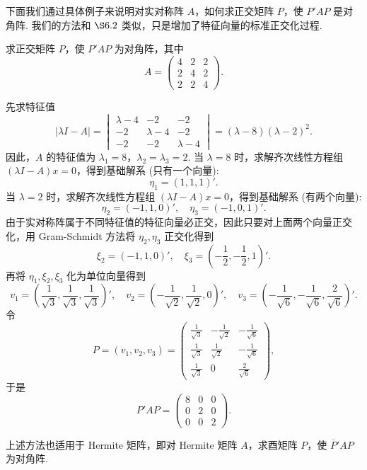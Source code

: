 \documentclass[../../main.tex]{subfiles}
\begin{document}
\vspace{0.5cm}

下面我们通过具体例子来说明对实对称阵 $A$，如何求正交矩阵 $P$，使 $P'AP$ 是对角阵. 我们的方法和 $\S 6.2$ 类似，只是增加了特征向量的标准正交化过程.
\begin{example}
求正交矩阵 $P$，使 $P'AP$ 为对角阵，其中
\[
A = \begin{pmatrix}
4 & 2 & 2 \\
2 & 4 & 2 \\
2 & 2 & 4
\end{pmatrix}.
\]
\end{example}
\begin{solution}
先求特征值
\[
|\lambda I - A| = 
\begin{vmatrix}
\lambda - 4 & -2 & -2 \\
-2 & \lambda - 4 & -2 \\
-2 & -2 & \lambda - 4
\end{vmatrix}
= (\lambda - 8)(\lambda - 2)^2.
\]
因此，$A$ 的特征值为 $\lambda_1 = 8$，$\lambda_2 = \lambda_3 = 2$. 当 $\lambda = 8$ 时，求解齐次线性方程组 $(\lambda I - A)x = 0$，得到基础解系 (只有一个向量):
\[
\eta_1 = (1,1,1)'.
\]
当 $\lambda = 2$ 时，求解齐次线性方程组 $(\lambda I - A)x = 0$，得到基础解系 (有两个向量):
\[
\eta_2 = (-1,1,0)', \quad \eta_3 = (-1,0,1)'.
\]
由于实对称阵属于不同特征值的特征向量必正交，因此只要对上面两个向量正交化，用 Gram-Schmidt 方法将 $\eta_2,\eta_3$ 正交化得到
\[
\xi_2 = (-1,1,0)', \quad \xi_3 = (-\frac{1}{2},-\frac{1}{2},1)'.
\]
再将 $\eta_1,\xi_2,\xi_3$ 化为单位向量得到
\[
v_1 = (\frac{1}{\sqrt{3}},\frac{1}{\sqrt{3}},\frac{1}{\sqrt{3}})', \quad 
v_2 = (-\frac{1}{\sqrt{2}},\frac{1}{\sqrt{2}},0)', \quad 
v_3 = (-\frac{1}{\sqrt{6}},-\frac{1}{\sqrt{6}},\frac{2}{\sqrt{6}})'.
\]
令
\[
P = (v_1,v_2,v_3) = 
\begin{pmatrix}
\frac{1}{\sqrt{3}} & -\frac{1}{\sqrt{2}} & -\frac{1}{\sqrt{6}} \\
\frac{1}{\sqrt{3}} & \frac{1}{\sqrt{2}} & -\frac{1}{\sqrt{6}} \\
\frac{1}{\sqrt{3}} & 0 & \frac{2}{\sqrt{6}}
\end{pmatrix},
\]
于是
\[
P'AP = 
\begin{pmatrix}
8 & 0 & 0 \\
0 & 2 & 0 \\
0 & 0 & 2
\end{pmatrix}.
\]

\end{solution}
\begin{remark}
上述方法也适用于 Hermite 矩阵，即对 Hermite 矩阵 $A$，求酉矩阵 $P$，使 $\overline{P}'AP$ 为对角阵.
\end{remark}
\end{document}
